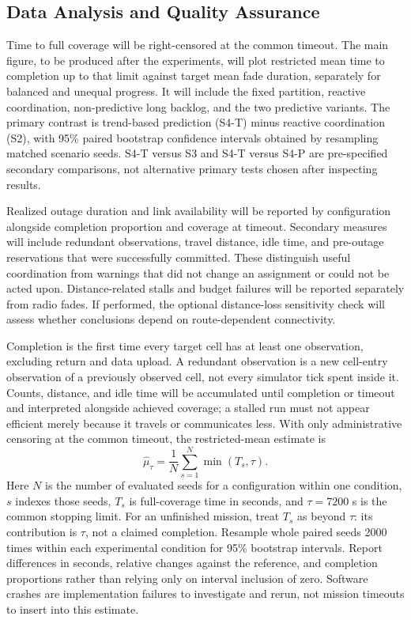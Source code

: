 \subsection{Data Analysis and Quality Assurance}

Time to full coverage will be right-censored at the common timeout. The main figure, to be produced after the experiments, will plot restricted mean time to completion up to that limit against target mean fade duration, separately for balanced and unequal progress. It will include the fixed partition, reactive coordination, non-predictive long backlog, and the two predictive variants. The primary contrast is trend-based prediction (S4-T) minus reactive coordination (S2), with 95\% paired bootstrap confidence intervals obtained by resampling matched scenario seeds. S4-T versus S3 and S4-T versus S4-P are pre-specified secondary comparisons, not alternative primary tests chosen after inspecting results.

Realized outage duration and link availability will be reported by configuration alongside completion proportion and coverage at timeout. Secondary measures will include redundant observations, travel distance, idle time, and pre-outage reservations that were successfully committed. These distinguish useful coordination from warnings that did not change an assignment or could not be acted upon. Distance-related stalls and budget failures will be reported separately from radio fades. If performed, the optional distance-loss sensitivity check will assess whether conclusions depend on route-dependent connectivity.

Completion is the first time every target cell has at least one observation, excluding return and data upload. A redundant observation is a new cell-entry observation of a previously observed cell, not every simulator tick spent inside it. Counts, distance, and idle time will be accumulated until completion or timeout and interpreted alongside achieved coverage; a stalled run must not appear efficient merely because it travels or communicates less. With only administrative censoring at the common timeout, the restricted-mean estimate is
\begin{equation}
\label{eq:restricted-mean}
\widehat{\mu}_{\tau}=\frac{1}{N}\sum_{s=1}^{N}\min(T_s,\tau).
\end{equation}
Here $N$ is the number of evaluated seeds for a configuration within one condition, $s$ indexes those seeds, $T_s$ is full-coverage time in seconds, and $\tau=7200$ s is the common stopping limit. For an unfinished mission, treat $T_s$ as beyond $\tau$: its contribution is $\tau$, not a claimed completion. Resample whole paired seeds 2000 times within each experimental condition for 95\% bootstrap intervals. Report differences in seconds, relative changes against the reference, and completion proportions rather than relying only on interval inclusion of zero. Software crashes are implementation failures to investigate and rerun, not mission timeouts to insert into this estimate.

